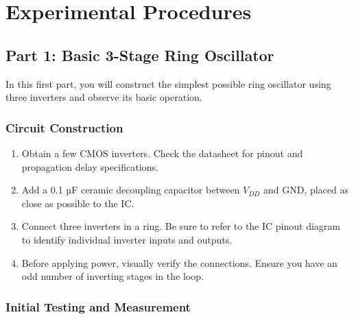 \documentclass[10pt]{article}
\begin{document}
\section{Experimental Procedures}

\subsection{Part 1: Basic 3-Stage Ring Oscillator}

In this first part, you will construct the simplest possible ring oscillator using three inverters and observe its basic operation.

\subsubsection{Circuit Construction}

\begin{enumerate}
    \item Obtain a few CMOS inverters. Check the datasheet for pinout and propagation delay specifications.
    
    \item Add a 0.1 µF ceramic decoupling capacitor between $V_{DD}$ and GND, placed as close as possible to the IC. 
    
    \item Connect three inverters in a ring. Be sure to refer to the IC pinout diagram to identify individual inverter inputs and outputs.
    
    \item Before applying power, visually verify the connections.  Ensure you have an odd number of inverting stages in the loop.
\end{enumerate}

\subsubsection{Initial Testing and Measurement}
\end{document}
